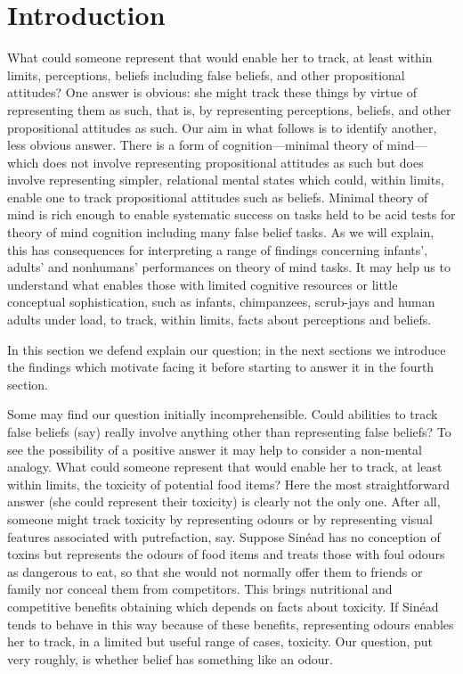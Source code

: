 \documentclass[12pt,\papersize]{extarticle}
\begin{document}
\section{Introduction}
What could someone represent that would enable her to track, at least within limits, perceptions, beliefs including false beliefs, and other propositional attitudes? 
One answer is obvious: she might track these things by virtue of representing them as such, that is, by representing perceptions, beliefs, and other propositional attitudes as such.
Our aim in what follows is to identify another, less obvious answer.
There is a form of cognition---minimal theory of mind---which does not involve representing propositional attitudes as such but does involve representing simpler, relational mental states which could, within limits, enable one to track propositional attitudes such as beliefs.
Minimal theory of mind 
is  rich enough to enable systematic success on tasks held to be acid tests for theory of mind cognition including many false belief tasks.
As we will explain, this has consequences 
for interpreting a range of findings concerning infants', adults' and nonhumans' performances on theory of mind tasks.
It may help us to understand what enables those with limited cognitive resources or little conceptual sophistication, such as infants, chimpanzees, scrub-jays and human adults under load, to track, within limits, facts about perceptions and beliefs.

In this section we defend explain our question; in the next sections we introduce the findings which motivate facing it before starting to answer it in the fourth section.

Some may find our question initially incomprehensible.
Could abilities to track false beliefs (say) really involve anything other than representing false beliefs?
To see the possibility of a positive answer it may help to consider a non-mental analogy.
What could someone represent that would enable her to track, at least within limits, the toxicity of potential food items?
Here the most straightforward answer (she could represent their toxicity) is clearly not the only one.
After all, someone might track toxicity by representing odours or by representing visual features associated with putrefaction, say.
Suppose Sin\'ead has no conception of toxins but represents the odours of food items and 
treats those with foul odours as dangerous to eat,
so that she would not normally offer them to friends or family
nor conceal them from competitors.
This brings nutritional and competitive benefits obtaining which depends on facts about toxicity.
If Sin\'ead tends to behave in this way because of these benefits, 
representing odours enables her to track, in a limited but useful range of cases,  toxicity.
Our question, put very roughly, is whether   belief has something like an odour.
\end{document}

